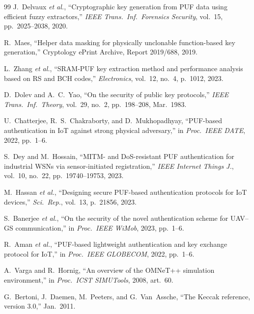 \documentclass[conference,a4paper,10pt]{IEEEtran}
\begin{document}
\begin{thebibliography}{99}
 J.~Delvaux \textit{et al.},
``Cryptographic key generation from PUF data using efficient fuzzy
extractors,'' \emph{IEEE Trans.\ Inf.\ Forensics Security}, vol.~15,
pp.~2025--2038, 2020.

 R.~Maes, ``Helper data masking for
physically unclonable function-based key generation,'' Cryptology
ePrint Archive, Report 2019/688, 2019.

 L.~Zhang \textit{et al.}, ``SRAM-PUF key
extraction method and performance analysis based on RS and BCH
codes,'' \emph{Electronics}, vol.~12, no.~4, p.~1012, 2023.

 D.~Dolev and A.~C.~Yao, ``On the security of
public key protocols,'' \emph{IEEE Trans.\ Inf.\ Theory}, vol.~29,
no.~2, pp.~198--208, Mar.~1983.

 U.~Chatterjee, R.~S.~Chakraborty,
and D.~Mukhopadhyay, ``PUF-based authentication in IoT against
strong physical adversary,'' in \emph{Proc.\ IEEE DATE}, 2022,
pp.~1--6.

 S.~Dey and M.~Hossain, ``MITM- and
DoS-resistant PUF authentication for industrial WSNs via
sensor-initiated registration,'' \emph{IEEE Internet Things J.},
vol.~10, no.~22, pp.~19740--19753, 2023.

 M.~Hassan \textit{et al.}, ``Designing
secure PUF-based authentication protocols for IoT devices,''
\emph{Sci.\ Rep.}, vol.~13, p.~21856, 2023.

 S.~Banerjee \textit{et al.},
``On the security of the novel authentication scheme for UAV--GS
communication,'' in \emph{Proc.\ IEEE WiMob}, 2023, pp.~1--6.

 R.~Aman \textit{et al.}, ``PUF-based
lightweight authentication and key exchange protocol for IoT,'' in
\emph{Proc.\ IEEE GLOBECOM}, 2022, pp.~1--6.

 A.~Varga and R.~Hornig, ``An overview of the
OMNeT++ simulation environment,'' in \emph{Proc.\ ICST SIMUTools},
2008, art.~60.

 G.~Bertoni, J.~Daemen, M.~Peeters, and
G.~Van~Assche, ``The Keccak reference, version 3.0,'' Jan.~2011.
\end{thebibliography}
\end{document}
